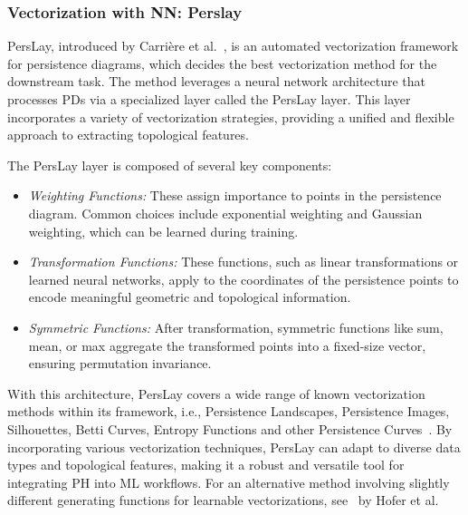 \subsubsection{Vectorization with NN: Perslay} \label{sec:perslay} PersLay, introduced by Carrière et al.~\cite{carriere2020perslay}, is an automated vectorization framework for persistence diagrams, which decides the best vectorization method for the downstream task. The method leverages a neural network architecture that processes PDs via a specialized layer called the PersLay layer. This layer incorporates a variety of vectorization strategies, providing a unified and flexible approach to extracting topological features.

The PersLay layer is composed of several key components: 
\begin{itemize}
    \item {\em Weighting Functions:} These assign importance to points in the persistence diagram. Common choices include exponential weighting and Gaussian weighting, which can be learned during training.
\item {\em Transformation Functions:} These functions, such as linear transformations or learned neural networks, apply to the coordinates of the persistence points to encode meaningful geometric and topological information.
\item {\em Symmetric Functions:} After transformation, symmetric functions like sum, mean, or max aggregate the transformed points into a fixed-size vector, ensuring permutation invariance.
\end{itemize}

With this architecture, PersLay covers a wide range of known vectorization methods within its framework, i.e., Persistence Landscapes, Persistence Images, Silhouettes, Betti Curves, Entropy Functions and other Persistence Curves~\cite{chung2019persistence}. By incorporating various vectorization techniques, PersLay can adapt to diverse data types and topological features, making it a robust and versatile tool for integrating PH into ML workflows. For an alternative method involving slightly different generating functions for learnable vectorizations, see~\cite{hofer2019learning} by Hofer et al.
 
 

